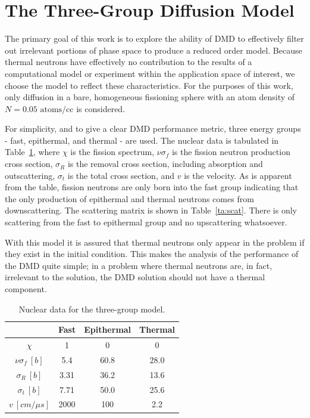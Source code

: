 \documentclass[12pt]{article}
\newcommand{\LTA}[1]{\label{ta:#1}}
\newcommand{\TA}[1]{Table~\ref{ta:#1}}
\newcommand{\bt}{\begin{table}}
\newcommand{\et}{\end{table}}
\newcommand{\btb}{\begin{center}\begin{tabular}}
\newcommand{\etb}{\end{tabular}\end{center}}
\begin{document}
\section{The Three-Group Diffusion Model}
The primary goal of this work is to explore the ability of DMD to effectively 
	filter out irrelevant portions of phase space to produce a reduced order 
	model.  
Because thermal neutrons have effectively no contribution to the results of a 
	computational model or experiment within the application space of interest, 
	we choose the model to reflect these characteristics. 
For the purposes of this  work, only diffusion in a bare, homogeneous 
	fissioning sphere with an atom density of $N = 0.05 \text{ atoms/cc}$ is 
	considered. 

For simplicity, and to give a clear DMD performance metric, three energy groups 
	- fast, epithermal, and thermal - are used.  
The nuclear data is tabulated in \TA{xs_data}, where $\chi$ is the fission 
	spectrum, $\nu\sigma_f$ is the fission neutron production cross section, 
	$\sigma_R$ is the removal cross section, including absorption and 
	outscattering, $\sigma_t$ is the total cross section, and $v$ is the velocity.
As is apparent from the table, fission neutrons are only born into the fast 
	group indicating that the only production of epithermal and thermal neutrons 
	comes from downscattering. 
The scattering matrix is shown in \TA{scat}.  
There is only scattering from the fast to epithermal group and no upscattering 
	whatsoever.  

With this model it is assured that thermal neutrons only appear in the problem 
	if they exist in the initial condition.  
This makes the analysis of the performance of the DMD quite simple; in a 
	problem where thermal neutrons are, in fact, irrelevant to the solution, the 
	DMD solution should not have a thermal component. 

\bt[h] \centering 
	\caption{Nuclear data for the three-group model.} 
	\btb{|c|c|c|c|}
		\hline
		\diagbox{Reaction}{Group} & Fast  & Epithermal  & Thermal  \\  \hline
		$\chi$  & 1 & 0 & 0 \\ 	\hline
		$\nu\sigma_f \ [b]$ & 5.4 & 60.8 & 28.0 \\  \hline
		$\sigma_R \ [b]$  & 3.31 & 36.2 & 13.6 \\  \hline
		$\sigma_t \ [b]$ & 7.71 & 50.0 & 25.6\\ \hline
		$v \ [cm/\mu s]$ & 2000 & 100 & 2.2 \\  \hline
	\etb  \LTA{xs_data}
\et
\end{document}
